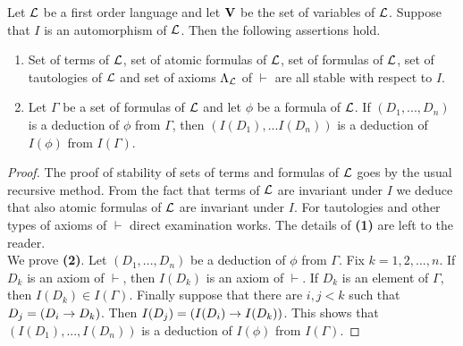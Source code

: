 \begin{theorem}\label{theorem:stability_under_automorphisms}
Let ${\mathcal L}$ be a first order language and let $\mathbf{V}$ be the set of variables of ${\mathcal L}$. Suppose that $I$ is an automorphism of ${\mathcal L}$. Then the following assertions hold.
\begin{enumerate}[label=\textbf{\emph{(\arabic*)}}, leftmargin=3.0em]
\item Set of terms of ${\mathcal L}$, set of atomic formulas of ${\mathcal L}$, set of formulas of ${\mathcal L}$, set of tautologies of ${\mathcal L}$ and set of
axioms $\Lambda_{{\mathcal L}}$ of $\vdash$ are all stable with respect to $I$.
\item Let $\Gamma$ be a set of formulas of ${\mathcal L}$ and let $\phi$ be a formula of ${\mathcal L}$. If $(D_1 , ..., D_n)$ is a deduction of $\phi$ from $\Gamma$, then $(I(D_1 ), ...I(D_n))$ is a deduction of $I(\phi)$ from $I(\Gamma)$.
\end{enumerate}
\end{theorem}
\begin{proof}
The proof of stability of sets of terms and formulas of ${\mathcal L}$ goes by the usual recursive method. From the fact that terms of ${\mathcal L}$ are invariant under $I$ we deduce that also atomic formulas of ${\mathcal L}$ are invariant under $I$. For tautologies and other types of axioms of $\vdash$ direct examination works. The details of \textbf{(1)} are left to the reader.\\
We prove \textbf{(2)}. Let $(D_1 , ..., D_n)$ be a deduction of $\phi$ from $\Gamma$. Fix $k=1, 2, ..., n$. If $D_k$ is an axiom of $\vdash$, then $I(D_k)$ is an axiom of $\vdash$. If $D_k$ is an element of $\Gamma$, then $I(D_k) \in I(\Gamma)$. Finally suppose that there are $i, j < k$ such that $D_j = (D_i \rightarrow D_k)$. Then $I(D_j) = \left(I(D_i) \rightarrow I(D_k)\right)$. This shows that $(I(D_1), ..., I(D_n))$ is a deduction of $I(\phi)$ from $I(\Gamma)$.
\end{proof}

